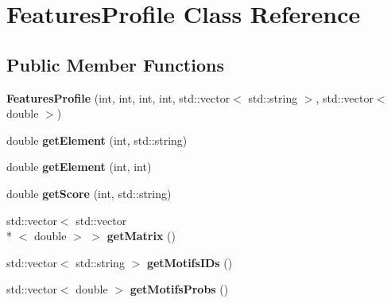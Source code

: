 \hypertarget{class_features_profile}{\section{Features\+Profile Class Reference}
\label{class_features_profile}
}
\subsection*{Public Member Functions}
\begin{DoxyCompactItemize}
\item 
\hypertarget{class_features_profile_ac0be0d6b37b1ec6bcb632a07f3b53cf7}{{\bfseries Features\+Profile} (int, int, int, int, std\+::vector$<$ std\+::string $>$, std\+::vector$<$ double $>$)}\label{class_features_profile_ac0be0d6b37b1ec6bcb632a07f3b53cf7}

\item 
\hypertarget{class_features_profile_a8c50ccb9a624d4791d290bb392a2a80e}{double {\bfseries get\+Element} (int, std\+::string)}\label{class_features_profile_a8c50ccb9a624d4791d290bb392a2a80e}

\item 
\hypertarget{class_features_profile_a3053d35d5a3a97165a4d46c03eb97026}{double {\bfseries get\+Element} (int, int)}\label{class_features_profile_a3053d35d5a3a97165a4d46c03eb97026}

\item 
\hypertarget{class_features_profile_a1efcee004e320c50c22971157db89e06}{double {\bfseries get\+Score} (int, std\+::string)}\label{class_features_profile_a1efcee004e320c50c22971157db89e06}

\item 
\hypertarget{class_features_profile_a9f877f6947a2ddb40b57524ba588f815}{std\+::vector$<$ std\+::vector\\*
$<$ double $>$ $>$ {\bfseries get\+Matrix} ()}\label{class_features_profile_a9f877f6947a2ddb40b57524ba588f815}

\item 
\hypertarget{class_features_profile_aa0cc647c1647d32cf8daee5f9b98ee3c}{std\+::vector$<$ std\+::string $>$ {\bfseries get\+Motifs\+I\+Ds} ()}\label{class_features_profile_aa0cc647c1647d32cf8daee5f9b98ee3c}

\item 
\hypertarget{class_features_profile_aa7cf161719fd9b051b9436c83e3f0dae}{std\+::vector$<$ double $>$ {\bfseries get\+Motifs\+Probs} ()}\label{class_features_profile_aa7cf161719fd9b051b9436c83e3f0dae}


\end{DoxyCompactItemize}
